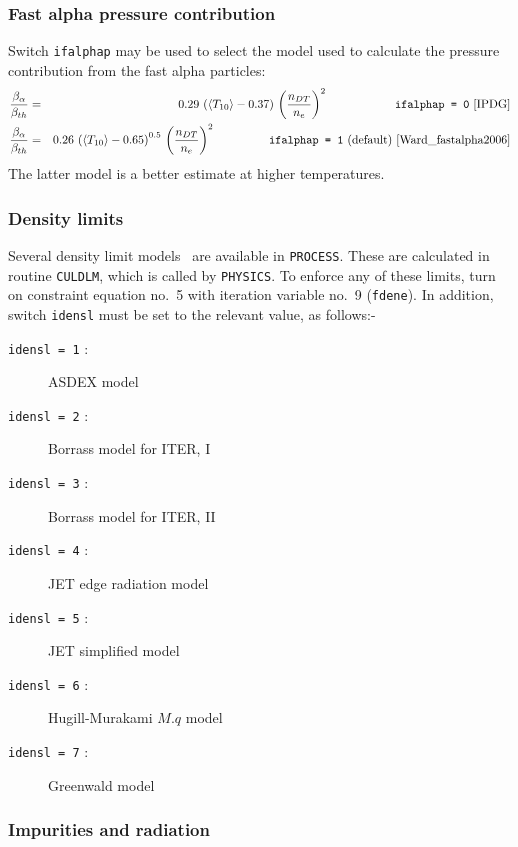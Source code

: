\documentclass[11pt,a4paper]{report}
\newcommand{\process}{\mbox{\texttt{PROCESS}}}
\begin{document}
\subsubsection{Fast alpha pressure contribution}

Switch \texttt{ifalphap} may be used to select the model used to calculate the
pressure contribution from the fast alpha particles:
\begin{eqnarray}
\frac{\beta_{\alpha}}{\beta_{th}} & = & 0.29 \, \left( \langle T_{10} \rangle -
  0.37 \right) \, \left( \frac{n_{DT}}{n_e} \right)^2
\hspace{20mm} \mbox{\texttt{ifalphap = 0}~\cite{IPDG}} \\
\frac{\beta_{\alpha}}{\beta_{th}} & = & 0.26 \, \left( \langle T_{10} \rangle -
  0.65 \right)^{0.5} \, \left( \frac{n_{DT}}{n_e} \right)^2
\hspace{16mm} \mbox{\texttt{ifalphap = 1} (default)~\cite{Ward_fastalpha2006}}
\end{eqnarray}
The latter model is a better estimate at higher temperatures.

\subsubsection{Density limits}

Several density limit models~\cite{172} are available in \process. These are
calculated in routine \texttt{CULDLM}, which is called by \texttt{PHYSICS}.
To enforce any of these limits, turn on constraint equation no.~5 with
iteration variable no.~9 (\texttt{fdene}).  In addition, switch
\texttt{idensl} must be set to the relevant value, as follows:-
\begin{description} %
\item [\texttt{idensl = 1} :] ASDEX model
\item [\texttt{idensl = 2} :] Borrass model for ITER, I
\item [\texttt{idensl = 3} :] Borrass model for ITER, II
\item [\texttt{idensl = 4} :] JET edge radiation model
\item [\texttt{idensl = 5} :] JET simplified model
\item [\texttt{idensl = 6} :] Hugill-Murakami $M.q$ model
\item [\texttt{idensl = 7} :] Greenwald model
\end{description}

\subsubsection{Impurities and radiation}
\label{sec:radiation}
\end{document}
